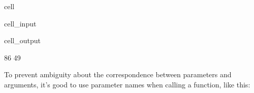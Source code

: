 \documentclass[letterpaper,10pt,english]{jupyterBook}
\begin{document}
\begin{sphinxuseclass}{cell}\begin{sphinxVerbatimInput}

\begin{sphinxuseclass}{cell_input}
\begin{sphinxVerbatim}[commandchars=\\\{\}]
    
       

 
\end{sphinxVerbatim}

\end{sphinxuseclass}\end{sphinxVerbatimInput}
\begin{sphinxVerbatimOutput}

\begin{sphinxuseclass}{cell_output}
\begin{sphinxVerbatim}[commandchars=\\\{\}]
86
49
\end{sphinxVerbatim}

\end{sphinxuseclass}\end{sphinxVerbatimOutput}

\end{sphinxuseclass}
\sphinxAtStartPar
To prevent ambiguity about the correspondence between parameters and arguments, it’s good to use parameter names when calling a function, like this:
\end{document}
